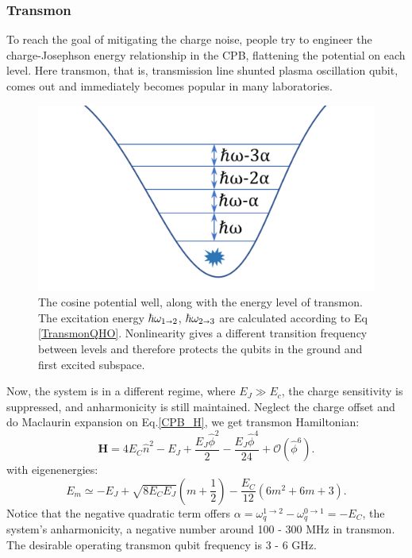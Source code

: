 \subsubsection{Transmon}
To reach the goal of mitigating the charge noise, people try to engineer the charge-Josephson energy relationship in the CPB, flattening the potential on each level. Here transmon, that is, transmission line shunted plasma oscillation qubit, comes out and immediately becomes popular in many laboratories.\cite{RN6, RN13}

\begin{figure}[h!]
    \centering
    \includegraphics[width=0.5\linewidth]{Pic/QHO_transmon.png}
    \caption{The cosine potential well, along with the energy level of transmon. The excitation energy $\hbar\omega_{1\shortrightarrow 2}$, $\hbar\omega_{2\shortrightarrow 3}$ are calculated according to Eq \ref{TransmonQHO}. Nonlinearity gives a different transition frequency between levels and therefore protects the qubits in the ground and first excited subspace.}
    \label{fig:my_label}
\end{figure}

Now, the system is in a different regime, where $E_J \gg E_c$, the charge sensitivity is suppressed, and anharmonicity is still maintained. Neglect the charge offset and do Maclaurin expansion on Eq.\ref{CPB_H}, we get transmon Hamiltonian:
\begin{equation}
    \mathbf{H} = 4E_C\hat{n}^2 - E_J + \frac{E_J\hat{\phi}^2}{2} - \frac{E_J\hat{\phi}^4}{24} +  \mathcal{O}(\hat{\phi}^6).
\end{equation}
with eigenenergies:
\begin{equation}\label{TransmonQHO}
    E_m \simeq -E_J + \sqrt{8E_C E_J}(m+\frac{1}{2}) - \frac{E_C}{12}(6m^2 + 6m + 3).
\end{equation}
Notice that the negative quadratic term offers $\alpha = \omega^{1\to 2}_q - \omega^{0\to 1}_q = -E_C$, the system's anharmonicity, a negative number around 100 - 300 MHz in transmon. The desirable operating transmon qubit frequency is 3 - 6 GHz.


